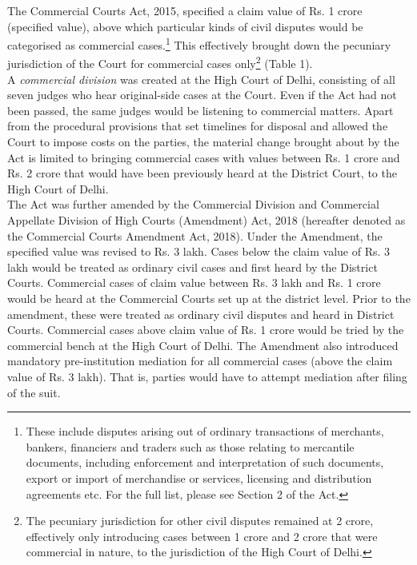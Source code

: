 \documentclass[a4paper, 12pt, twoside]{article}
\begin{document}
The Commercial Courts Act, 2015, specified a claim value of Rs. 1 crore (specified value), above which particular kinds of civil disputes would be categorised as commercial cases.\footnote{These include disputes arising out of ordinary transactions of merchants, bankers, financiers and traders such as those relating to mercantile documents, including enforcement and interpretation of such documents, export or import of merchandise or services, licensing and distribution agreements etc. For the full list, please see Section 2 of the Act.} This effectively brought down the pecuniary jurisdiction of the Court for commercial cases only\footnote{The pecuniary jurisdiction for other civil disputes remained at 2 crore, effectively only introducing cases between 1 crore and 2 crore that were commercial in nature, to the jurisdiction of the High Court of Delhi.} (Table 1). \\

A \textit{commercial division} was created at the High Court of Delhi, consisting of all seven judges who hear original-side cases at the Court. Even if the Act had not been passed, the same judges would be listening to commercial matters. Apart from the procedural provisions that set timelines for disposal and allowed the Court to impose costs on the parties, the material change brought about by the Act is limited to bringing commercial cases with values between Rs. 1 crore and Rs. 2 crore that would have been previously heard at the District Court, to the High Court of Delhi. \\

The Act was further amended by the Commercial Division and Commercial Appellate Division of High Courts (Amendment) Act, 2018 (hereafter denoted as the Commercial Courts Amendment Act, 2018). Under the Amendment, the specified value was revised to Rs. 3 lakh. Cases below the claim value of Rs. 3 lakh would be treated as ordinary civil cases and first heard by the District Courts. Commercial cases of claim value between Rs. 3 lakh and Rs. 1 crore would be heard at the Commercial Courts set up at the district level. Prior to the amendment, these were treated as ordinary civil disputes and heard in District Courts. Commercial cases above claim value of Rs. 1 crore would be tried by the commercial bench at the High Court of Delhi. The Amendment also introduced mandatory pre-institution mediation for all commercial cases (above the claim value of Rs. 3 lakh). That is, parties would have to attempt mediation after filing of the suit.  
\end{document}
